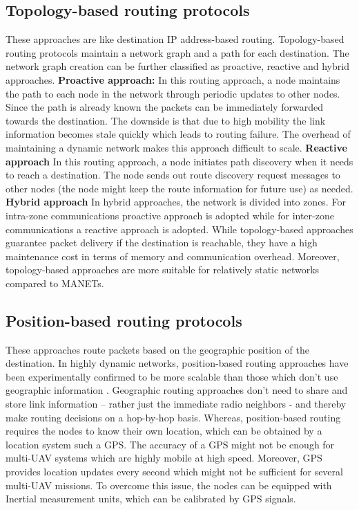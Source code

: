 \subsection{Topology-based routing protocols}
These approaches are like destination IP address-based routing. Topology-based routing protocols maintain a network graph and a path for each destination. The network graph creation can be further classified as proactive, reactive and hybrid approaches. 
\textbf{Proactive approach:} In this routing approach, a node maintains the path to each node in the network through periodic updates to other nodes. Since the path is already known the packets can be immediately forwarded towards the destination. The downside is that due to high mobility the link information becomes stale quickly which leads to routing failure. The overhead of maintaining a dynamic network makes this approach difficult to scale.
\textbf{Reactive approach} In this routing approach, a node initiates path discovery when it needs to reach a destination. The node sends out route discovery request messages to other nodes (the node might keep the route information for future use) as needed. 
\textbf{Hybrid approach} In hybrid approaches, the network is divided into zones. For intra-zone communications proactive approach is adopted while for inter-zone communications a reactive approach is adopted. 
While topology-based approaches guarantee packet delivery if the destination is reachable, they have a high maintenance cost in terms of memory and communication overhead. Moreover, topology-based approaches are more suitable for relatively static networks compared to MANETs.

\subsection{Position-based routing protocols}
These approaches route packets based on the geographic position of the destination. In highly dynamic networks, position-based routing approaches have been experimentally confirmed to be more scalable than those which don't use geographic information \cite{Stojmenovic:2002:PRA:2288474.2290160}. Geographic routing approaches don't need to share and store link information – rather just the immediate radio neighbors - and thereby make routing decisions on a hop-by-hop basis. Whereas, position-based routing requires the nodes to know their own location, which can be obtained by a location system such a GPS. The accuracy of a GPS might not be enough for multi-UAV systems which are highly mobile at high speed. Moreover, GPS provides location updates every second which might not be sufficient for several multi-UAV missions. To overcome this issue, the nodes can be equipped with Inertial measurement units, which can be calibrated by GPS signals.

